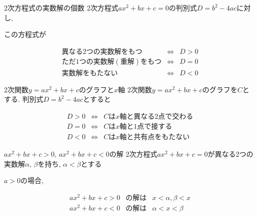 \documentclass[aspectratio=169, 12pt]{beamer} %
\begin{document}
\begin{frame}{2次方程式の実数解の個数}
    2次方程式$ax^2+bx+c=0$の判別式$D=b^2-4ac$に対し, \par
    この方程式が \par
    \begin{eqnarray*}
        異なる2つの実数解をもつ &\Leftrightarrow& D>0 \\
        ただ1つの実数解 (重解) をもつ &\Leftrightarrow& D=0 \\
        実数解をもたない &\Leftrightarrow& D<0
    \end{eqnarray*}
\end{frame}
\begin{frame}{2次関数$y=ax^2+bx+c$のグラフと$x$軸}
    2次関数$y=ax^2+bx+c$のグラフを$C$とする. 判別式$D=b^2-4ac$とすると \par
    \begin{eqnarray*}
        D>0&\Leftrightarrow& Cはx軸と異なる2点で交わる \\
        D=0&\Leftrightarrow& Cはx軸と1点で接する \\
        D<0&\Leftrightarrow& Cはx軸と共有点をもたない
    \end{eqnarray*}
\end{frame}
\begin{frame}{$ax^2+bx+c>0$, $ax^2+bx+c<0$の解}
    2次方程式$ax^2+bx+c=0$が異なる2つの実数解$\alpha$, $\beta$を持ち, $\alpha<\beta$とする \par
    $a>0$の場合, \par
    \begin{eqnarray*}
        ax^2+bx+c>0&の解は&x<\alpha, \beta<x \\
        ax^2+bx+c<0&の解は&\alpha<x<\beta
    \end{eqnarray*}
\end{frame}
\end{document}
